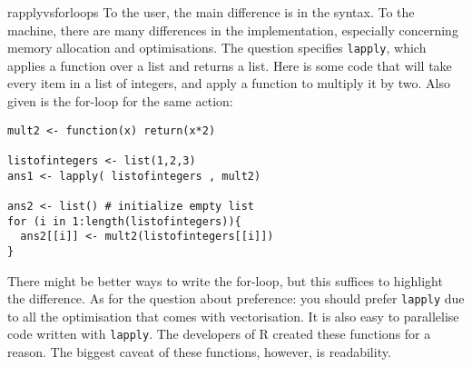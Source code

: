 \begin{subanswer}{rapplyvsforloops}
 To the user, the main difference is in the syntax.
 To the machine, there are many differences in the implementation, especially concerning memory allocation and optimisations.
 The question specifies \verb+lapply+, which applies a function over a list and returns a list.
 Here is some code that will take every item in a list of integers, and apply a function to multiply it by two.
 Also given is the for-loop for the same action:

\begin{verbatim}
mult2 <- function(x) return(x*2)

listofintegers <- list(1,2,3)
ans1 <- lapply( listofintegers , mult2)

ans2 <- list() # initialize empty list
for (i in 1:length(listofintegers)){
  ans2[[i]] <- mult2(listofintegers[[i]])
}
\end{verbatim}
There might be better ways to write the for-loop, but this suffices to highlight the difference.
As for the question about preference: you should prefer \verb+lapply+ due to all the optimisation that comes with vectorisation.
It is also easy to parallelise code written with \verb+lapply+.
The developers of R created these functions for a reason.
The biggest caveat of these functions, however, is readability.
\end{subanswer}
